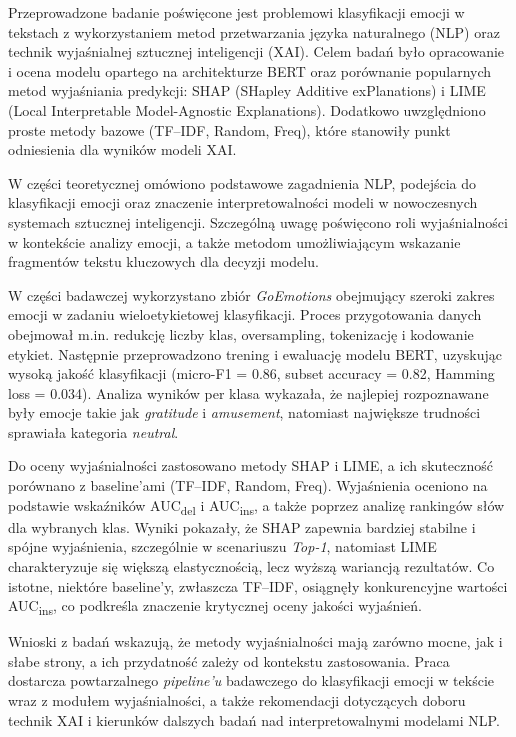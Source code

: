 \documentclass[wmii, inf, mgr]{uwmthesis}
\begin{document}
\begin{streszczenie}
Przeprowadzone badanie poświęcone jest problemowi klasyfikacji emocji w tekstach z wykorzystaniem metod przetwarzania języka naturalnego (NLP) oraz technik wyjaśnialnej sztucznej inteligencji (XAI). Celem badań było opracowanie i ocena modelu opartego na architekturze BERT oraz porównanie popularnych metod wyjaśniania predykcji: SHAP (SHapley Additive exPlanations) i LIME (Local Interpretable Model-Agnostic Explanations). Dodatkowo uwzględniono proste metody bazowe (TF--IDF, Random, Freq), które stanowiły punkt odniesienia dla wyników modeli XAI. 

W części teoretycznej omówiono podstawowe zagadnienia NLP, podejścia do klasyfikacji emocji oraz znaczenie interpretowalności modeli w nowoczesnych systemach sztucznej inteligencji. Szczególną uwagę poświęcono roli wyjaśnialności w kontekście analizy emocji, a także metodom umożliwiającym wskazanie fragmentów tekstu kluczowych dla decyzji modelu.

W części badawczej wykorzystano zbiór \emph{GoEmotions} obejmujący szeroki zakres emocji w zadaniu wieloetykietowej klasyfikacji. Proces przygotowania danych obejmował m.in. redukcję liczby klas, oversampling, tokenizację i kodowanie etykiet. Następnie przeprowadzono trening i ewaluację modelu BERT, uzyskując wysoką jakość klasyfikacji (micro-F1 = 0.86, subset accuracy = 0.82, Hamming loss = 0.034). Analiza wyników per klasa wykazała, że najlepiej rozpoznawane były emocje takie jak \emph{gratitude} i \emph{amusement}, natomiast największe trudności sprawiała kategoria \emph{neutral}. 

Do oceny wyjaśnialności zastosowano metody SHAP i LIME, a ich skuteczność porównano z baseline’ami (TF--IDF, Random, Freq). Wyjaśnienia oceniono na podstawie wskaźników AUC\textsubscript{del} i AUC\textsubscript{ins}, a także poprzez analizę rankingów słów dla wybranych klas. Wyniki pokazały, że SHAP zapewnia bardziej stabilne i spójne wyjaśnienia, szczególnie w scenariuszu \emph{Top-1}, natomiast LIME charakteryzuje się większą elastycznością, lecz wyższą wariancją rezultatów. Co istotne, niektóre baseline’y, zwłaszcza TF--IDF, osiągnęły konkurencyjne wartości AUC\textsubscript{ins}, co podkreśla znaczenie krytycznej oceny jakości wyjaśnień. 

Wnioski z badań wskazują, że metody wyjaśnialności mają zarówno mocne, jak i słabe strony, a ich przydatność zależy od kontekstu zastosowania. Praca dostarcza powtarzalnego \emph{pipeline’u} badawczego do klasyfikacji emocji w tekście wraz z modułem wyjaśnialności, a także rekomendacji dotyczących doboru technik XAI i kierunków dalszych badań nad interpretowalnymi modelami NLP.
\end{streszczenie}
\end{document}
